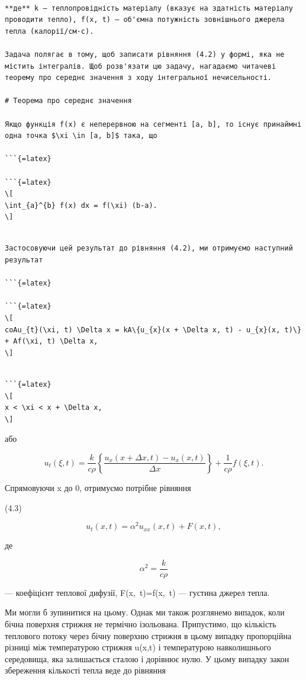 \documentclass[
  ukrainian,
]{article}
\begin{document}
\begin{verbatim}

**де** k — теплопровідність матеріалу (вказує на здатність матеріалу проводити тепло), f(x, t) — об'ємна потужність зовнішнього джерела тепла (калорії/см·с).

Задача полягає в тому, щоб записати рівняння (4.2) у формі, яка не містить інтегралів. Щоб розв'язати цю задачу, нагадаємо читачеві теорему про середнє значення з ходу інтегральної нечисельності.

# Теорема про середнє значення

Якщо функція f(x) є неперервною на сегменті [a, b], то існує принаймні одна точка $\xi \in [a, b]$ така, що

```{=latex}

```{=latex}
\[
\int_{a}^{b} f(x) dx = f(\xi) (b-a).
\]
\end{verbatim}

\begin{verbatim}

Застосовуючи цей результат до рівняння (4.2), ми отримуємо наступний результат

```{=latex}

```{=latex}
\[
coAu_{t}(\xi, t) \Delta x = kA\{u_{x}(x + \Delta x, t) - u_{x}(x, t)\} + Af(\xi, t) \Delta x,
\]
\end{verbatim}

\begin{verbatim}

```{=latex}
\[
x < \xi < x + \Delta x,
\]
\end{verbatim}

або

\[
u_t(\xi, t) = \frac{k}{c\rho} \left\{ \frac{u_x(x + \Delta x, t) - u_x(x, t)}{\Delta x} \right\} + \frac{1}{c\rho} f(\xi, t).
\]

Спрямовуючи \Delta x до 0, отримуємо потрібне рівняння

(4.3)

\[
u_t(x, t) = \alpha^2 u_{xx}(x, t) + F(x, t),
\]

де

\[
\alpha^{2}=\frac{k}{c\rho}
\]

--- коефіцієнт теплової дифузії,
F\left(x,~t\right)=f\left(x,~t\right) --- густина джерел
тепла.

Ми могли б зупинитися на цьому. Однак ми також розглянемо випадок, коли
бічна поверхня стрижня не термічно ізольована. Припустимо, що кількість
теплового потоку через бічну поверхню стрижня в цьому випадку
пропорційна різниці між температурою стрижня u(x,t) і температурою
навколишнього середовища, яка залишається сталою і дорівнює нулю. У
цьому випадку закон збереження кількості тепла веде до рівняння
\end{document}
